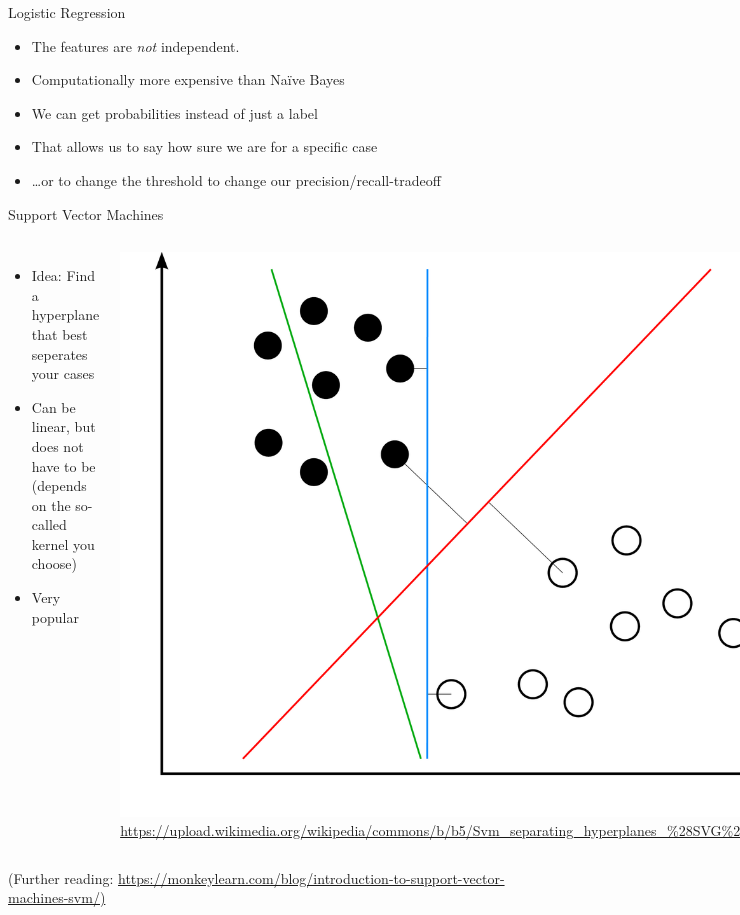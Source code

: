 \documentclass{beamer}
\begin{document}
\begin{frame}{Logistic Regression}
\begin{itemize}[<+->]
\item The features are \emph{not} independent.
\item Computationally more expensive than Naïve Bayes
\item We can get probabilities instead of just a label
\item That allows us to say how sure we are for a specific case
\item \ldots or to change the threshold to change our precision/recall-tradeoff
\end{itemize}
\end{frame}



\begin{frame}{Support Vector Machines}

\begin{columns}
	\begin{itemize}
	\item	Idea: Find a hyperplane that best seperates your cases
	\item Can be linear, but does not have to be (depends on the so-called kernel you choose)
	\item Very popular 
\end{itemize}
	
		\includegraphics[width=.8\linewidth,height=.5\paperheight,keepaspectratio]{../../pictures/svm}
	\tiny{\url{https://upload.wikimedia.org/wikipedia/commons/b/b5/Svm\_separating\_hyperplanes\_\%28SVG\%29.svg}}
	
	\end{columns}
\vfill
\footnotesize{(Further reading: \url{https://monkeylearn.com/blog/introduction-to-support-vector-machines-svm/)}}
\end{frame}
\end{document}
